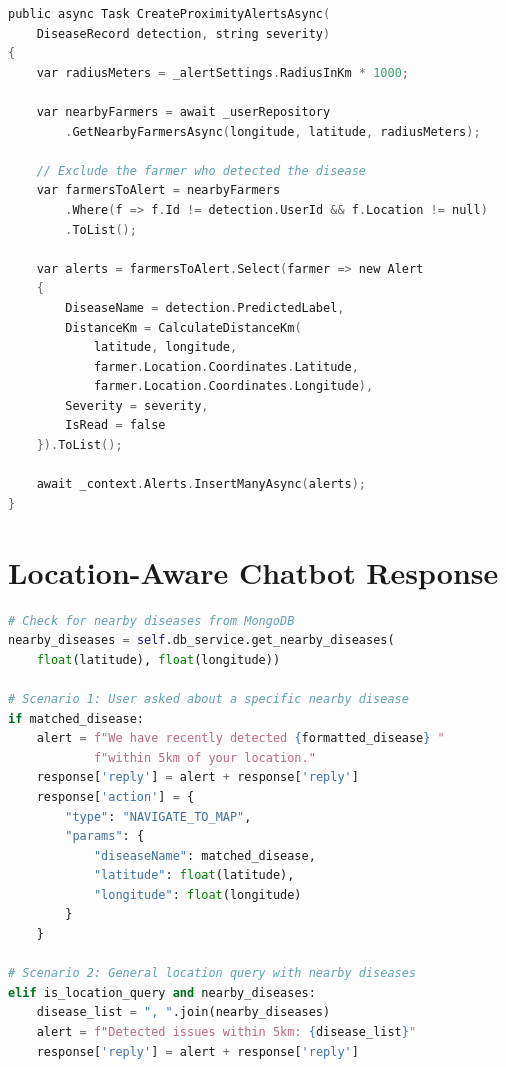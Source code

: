 \begin{lstlisting}[language=C,caption={AlertService.cs --- Proximity alert creation with Haversine distance},label={lst:alerts}]
public async Task CreateProximityAlertsAsync(
    DiseaseRecord detection, string severity)
{
    var radiusMeters = _alertSettings.RadiusInKm * 1000;
    
    var nearbyFarmers = await _userRepository
        .GetNearbyFarmersAsync(longitude, latitude, radiusMeters);
    
    // Exclude the farmer who detected the disease
    var farmersToAlert = nearbyFarmers
        .Where(f => f.Id != detection.UserId && f.Location != null)
        .ToList();
    
    var alerts = farmersToAlert.Select(farmer => new Alert
    {
        DiseaseName = detection.PredictedLabel,
        DistanceKm = CalculateDistanceKm(
            latitude, longitude,
            farmer.Location.Coordinates.Latitude,
            farmer.Location.Coordinates.Longitude),
        Severity = severity,
        IsRead = false
    }).ToList();
    
    await _context.Alerts.InsertManyAsync(alerts);
}
\end{lstlisting}


\section{Location-Aware Chatbot Response}

\begin{lstlisting}[language=Python,caption={chat\_service.py --- Location-aware contextual enrichment},label={lst:location_aware}]
# Check for nearby diseases from MongoDB
nearby_diseases = self.db_service.get_nearby_diseases(
    float(latitude), float(longitude))

# Scenario 1: User asked about a specific nearby disease
if matched_disease:
    alert = f"We have recently detected {formatted_disease} "
            f"within 5km of your location."
    response['reply'] = alert + response['reply']
    response['action'] = {
        "type": "NAVIGATE_TO_MAP",
        "params": {
            "diseaseName": matched_disease,
            "latitude": float(latitude),
            "longitude": float(longitude)
        }
    }

# Scenario 2: General location query with nearby diseases
elif is_location_query and nearby_diseases:
    disease_list = ", ".join(nearby_diseases)
    alert = f"Detected issues within 5km: {disease_list}"
    response['reply'] = alert + response['reply']
\end{lstlisting}

